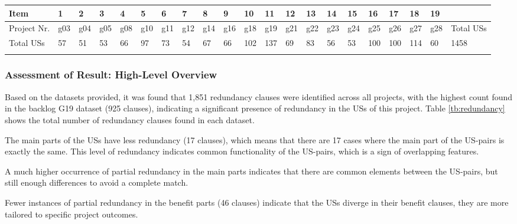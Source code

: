 \begingroup
\centering
\scriptsize
\renewcommand{\arraystretch}{1.5} 
\begin{tabularx}{\linewidth}{l|XXXXXXXXXXXXXXXXXXX|X}
	Item&	1&	2&	3&	4&	5&	6&	7&	8&	9&	10&	11&	12&	13&	14&	15&	16&	17&	18&	19&	\\
	\hline
	Project Nr.&	g03	&g04	&g05	&g08	&g10	&g11	&g12	&g14	&g16	&g18	&g19	&g21	&g22	&g23	&g24	&g25	&g26	&g27	&g28	&Total USs\\
	\hline
	Total USs&	57&	51	&53	&66	&97	&73	&54	&67	&66	&102	&137	&69	&83	&56	&53	&100	&100	&114	&60	&1458 \\
	\caption{Project number and count of USs contained in each backlog dataset}\label{tb:backlogs}
\end{tabularx}	
\endgroup
\subsubsection*{Assessment of Result: High-Level Overview}
Based on the datasets provided, it was found that 1,851 redundancy clauses were identified across all projects, with the highest count found in the backlog G19 dataset (925 clauses), indicating a significant presence of redundancy in the USs of this project. Table \ref{tb:redundancy} shows the total number of redundancy clauses found in each dataset.

The main parts of the USs have less redundancy (17 clauses), which means that there are 17 cases where the main part of the US-pairs is exactly the same. This level of redundancy indicates common functionality of the US-pairs, which is a sign of overlapping features. 

A much higher occurrence of partial redundancy in the main parts indicates that there are common elements between the US-pairs, but still enough differences to avoid a complete match. 

Fewer instances of partial redundancy in the benefit parts (46 clauses) indicate that the USs diverge in their benefit clauses, they are more tailored to specific project outcomes. 

